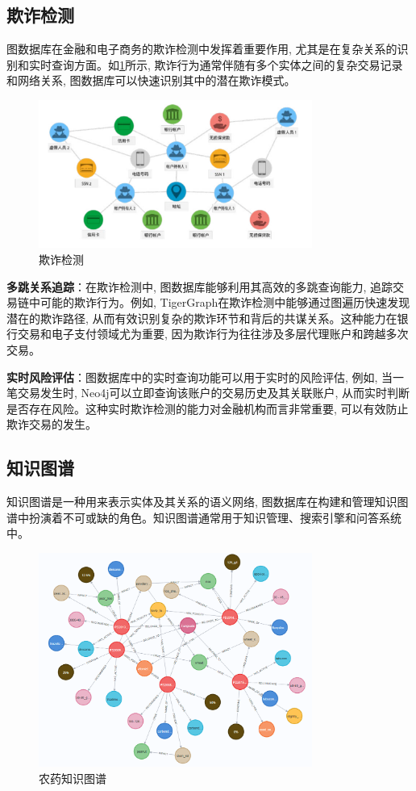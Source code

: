 \subsection{欺诈检测}
图数据库在金融和电子商务的欺诈检测中发挥着重要作用, 尤其是在复杂关系的识别和实时查询方面。如\cref{fig:21}所示, 欺诈行为通常伴随有多个实体之间的复杂交易记录和网络关系, 图数据库可以快速识别其中的潜在欺诈模式。
\begin{figure}[H]
	\centering
	\includegraphics[width=0.8\textwidth]{images/21.png}
	\caption{欺诈检测}
	\label{fig:21}
\end{figure}

\textbf{多跳关系追踪}：在欺诈检测中, 图数据库能够利用其高效的多跳查询能力, 追踪交易链中可能的欺诈行为。例如, TigerGraph在欺诈检测中能够通过图遍历快速发现潜在的欺诈路径, 从而有效识别复杂的欺诈环节和背后的共谋关系。这种能力在银行交易和电子支付领域尤为重要, 因为欺诈行为往往涉及多层代理账户和跨越多次交易\cite{mao2022financial,cheng2020graph,li2022internet}。

\textbf{实时风险评估}：图数据库中的实时查询功能可以用于实时的风险评估, 例如, 当一笔交易发生时, Neo4j可以立即查询该账户的交易历史及其关联账户, 从而实时判断是否存在风险。这种实时欺诈检测的能力对金融机构而言非常重要, 可以有效防止欺诈交易的发生。


\subsection{知识图谱}
知识图谱是一种用来表示实体及其关系的语义网络, 图数据库在构建和管理知识图谱中扮演着不可或缺的角色。知识图谱通常用于知识管理、搜索引擎和问答系统中\cite{黄恒琪2019知识图谱研究综述}。
\begin{figure}[H]
    \centering
    \includegraphics[width=0.8\textwidth]{images/23.png}
    \caption{农药知识图谱}
    \label{fig:23}
\end{figure}

